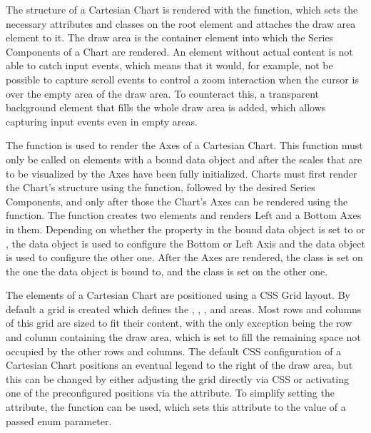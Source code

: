 The structure of a Cartesian Chart is rendered with the
 function, which sets the necessary
attributes and classes on the root element and attaches the draw area
 element to it.  The draw area is the container element
into which the Series Components of a Chart are rendered.  An
 element without actual content is not able to catch input
events, which means that it would, for example, not be possible to
capture scroll events to control a zoom interaction when the cursor is
over the empty area of the draw area.  To counteract this, a
transparent  background element that fills the whole draw
area is added, which allows capturing input events even in empty
areas.

The  function is used to render the
Axes of a Cartesian Chart.  This function must only be called on
elements with a bound  data object and after the
scales that are to be visualized by the Axes have been fully
initialized.  Charts must first render the Chart's structure using the
 function, followed by the desired Series
Components, and only after those the Chart's Axes can be rendered
using the  function.  The
 function creates two 
elements and renders Left and a Bottom Axes in them.  Depending on
whether the  property in the bound data object is set to
 or , the  data object is used to
configure the Bottom or Left Axis and the  data object is
used to configure the other one.  After the Axes are rendered, the
 class is set on the one the  data object is
bound to, and the  class is set on the other one.

The elements of a Cartesian Chart are positioned using a CSS Grid
layout.  By default a grid is created which defines the
, , , and
 areas.  Most rows and columns of this grid are sized to
fit their content, with the only exception being the row and column
containing the draw area, which is set to fill the remaining space not
occupied by the other rows and columns.  The default CSS configuration
of a Cartesian Chart positions an eventual legend to the right of the
draw area, but this can be changed by either adjusting the grid
directly via CSS or activating one of the preconfigured positions via
the  attribute.  To simplify setting the
 attribute, the 
function can be used, which sets this attribute to the value of a
passed  enum parameter.


